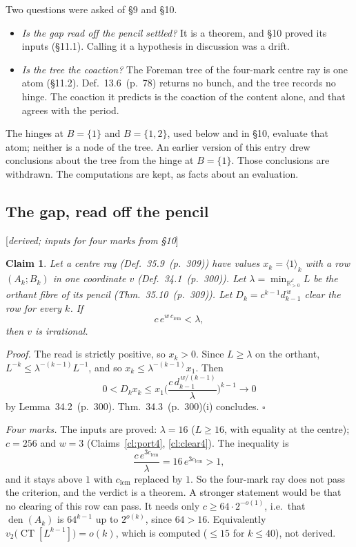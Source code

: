 \documentclass[11pt]{article}
\newcommand{\cE}{\mathcal E}
\DeclareMathOperator*{\CT}{CT}
\newcommand{\status}[1]{\hfill{\small[\textit{#1}]}}
\newcommand{\hb}[2]{#1~(p.~#2)}   %
\theoremstyle{plain}
\newtheorem{claim}{Claim}[section]
\theoremstyle{remark}
\begin{document}
Two questions were asked of \S9 and \S10.
\begin{itemize}
\item \emph{Is the gap read off the pencil settled?} It is a theorem, and \S10 proved its inputs (\S11.1). Calling it a hypothesis in discussion was a drift.
\item \emph{Is the tree the coaction?} The Foreman tree of the four-mark centre ray is one atom (\S11.2). Def.~\hb{13.6}{78} returns no bunch, and the tree records no hinge. The coaction it predicts is the coaction of the content alone, and that agrees with the period.
\end{itemize}
The hinges at $B=\{1\}$ and $B=\{1,2\}$, used below and in \S10, evaluate that atom; neither is a node of the tree. An earlier version of this entry drew conclusions about the tree from the hinge at $B=\{1\}$. Those conclusions are withdrawn. The computations are kept, as facts about an evaluation.

\subsection{The gap, read off the pencil}\status{derived; inputs for four marks from \S10}

\begin{claim}\label{cl:gappencil}
Let a centre ray (Def.~\hb{35.9}{309}) have values $x_k=\langle1\rangle_k$ with a row $(A_k;B_k)$ in one coordinate $v$ (Def.~\hb{34.1}{300}). Let $\lambda=\min_{\mathbb R^{\cE}_{>0}}L$ be the orthant fibre of its pencil (Thm.~\hb{35.10}{309}). Let $D_k=c^{k-1}d_{k-1}^{\,w}$ clear the row for every $k$. If
\[
c\,e^{w\,c_{\mathrm{lcm}}}<\lambda,
\]
then $v$ is irrational.
\end{claim}

\emph{Proof.} The read is strictly positive, so $x_k>0$. Since $L\ge\lambda$ on the orthant, $L^{-k}\le\lambda^{-(k-1)}L^{-1}$, and so $x_k\le\lambda^{-(k-1)}x_1$. Then
\[
0<D_kx_k\le x_1\Big(\frac{c\,d_{k-1}^{\,w/(k-1)}}{\lambda}\Big)^{k-1}\longrightarrow0
\]
by Lemma~\hb{34.2}{300}. Thm.~\hb{34.3}{300}(i) concludes. $\square$

\emph{Four marks.} The inputs are proved: $\lambda=16$ ($L\ge16$, with equality at the centre); $c=256$ and $w=3$ (Claims~\ref{cl:port4}, \ref{cl:clear4}). The inequality is
\[
\frac{c\,e^{3c_{\mathrm{lcm}}}}{\lambda}=16\,e^{3c_{\mathrm{lcm}}}>1,
\]
and it stays above $1$ with $c_{\mathrm{lcm}}$ replaced by $1$. So the four-mark ray does not pass the criterion, and the verdict is a theorem. A stronger statement would be that no clearing of this row can pass. It needs only $c\ge64\cdot2^{-o(1)}$, i.e.\ that $\operatorname{den}(A_k)$ is $64^{k-1}$ up to $2^{o(k)}$, since $64>16$. Equivalently $v_2\big(\CT[L^{k-1}]\big)=o(k)$, which is computed ($\le15$ for $k\le40$), not derived.
\end{document}
